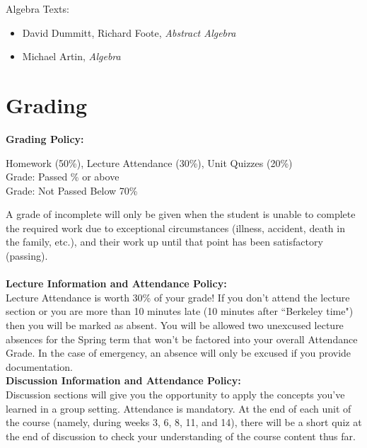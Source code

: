 \documentclass[11pt, a4paper]{article}
\begin{document}
\noindent Algebra Texts:
\begin{itemize}
    \item David Dummitt, Richard Foote, \textit{Abstract Algebra}
    \item Michael Artin, \textit{Algebra}
\end{itemize}

\section*{Grading}
\noindent\textbf{Grading Policy:} 
\begin{center}
Homework (50\%), Lecture Attendance (30\%), Unit Quizzes (20\%)  \\
Grade: Passed \% or above \\
Grade: Not Passed  \dotfill Below 70\% 
\end{center}
A grade of incomplete will only be given when the student is unable to complete the required work due to exceptional circumstances (illness, accident, death
in the family, etc.), and their work up until that point has been satisfactory (passing). 
\\ \\
\noindent\textbf{Lecture Information and Attendance Policy:}
\\
Lecture Attendance is worth 30\% of your grade! If you don't attend the lecture section or you are more than 10 minutes late (10 minutes after ``Berkeley time") then you will be marked as absent. You will be allowed two unexcused lecture absences for the Spring term that won't be factored into your overall Attendance Grade. In the case of emergency, an absence will only be excused if you provide documentation. 
\\

\noindent\textbf{Discussion Information and Attendance Policy:} \\
Discussion sections will give you the opportunity to apply the concepts you’ve learned in a group setting. Attendance is mandatory. At the end of each unit of the course (namely, during weeks 3, 6, 8, 11, and 14), there will be a short quiz at the end of discussion to check your understanding of the course content thus far.
\\
\end{document}
